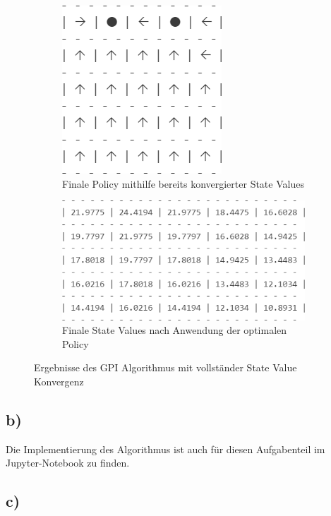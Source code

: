 \documentclass[11pt]{article}
\begin{document}
\begin{figure}
    \centering
    \begin{subfigure}[t]{0.32\textwidth}
        \centering
        \includegraphics[width=\textwidth]{img/3_1_a1.png}
        \caption{Finale Policy mithilfe bereits konvergierter State Values}
        \label{img:3_1_a1}
    \end{subfigure}
    \hfill
    \begin{subfigure}[t]{0.65\textwidth}
        \includegraphics[width=\textwidth]{img/3_1_a2.png}
        \caption{Finale State Values nach Anwendung der optimalen Policy}
        \label{img:3_1_a2}
    \end{subfigure}
    \caption{Ergebnisse des GPI Algorithmus mit vollständer State Value Konvergenz}
    \label{img:3_1_a}
\end{figure}

\subsection*{b)}
Die Implementierung des Algorithmus ist auch für diesen Aufgabenteil im Jupyter-Notebook zu finden.

\subsection*{c)}
\end{document}
